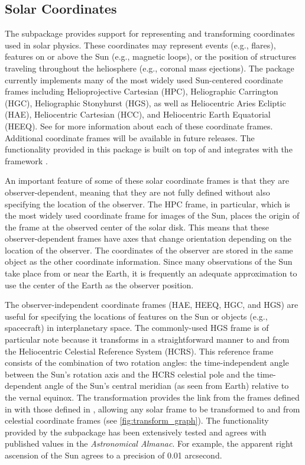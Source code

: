 \subsection{Solar Coordinates}
\label{sec:coords}

The  subpackage provides support for representing and transforming coordinates used in solar physics.
These coordinates may represent events (e.g., flares), features on or above the Sun (e.g., magnetic loops), or the position of structures traveling throughout the heliosphere (e.g., coronal mass ejections).
The package currently implements many of the most widely used Sun-centered coordinate frames including Helioprojective Cartesian (HPC), Heliographic Carrington (HGC), Heliographic Stonyhurst (HGS),  as well as Heliocentric Aries Ecliptic (HAE), Heliocentric Cartesian (HCC), and Heliocentric Earth Equatorial (HEEQ).
See \citet{2006A&A...449..791T} for more information about each of these coordinate frames.
Additional coordinate frames will be available in future releases.
The functionality provided in this package is built on top of and integrates with the  framework \citep[see Section 3.3 of][]{astropy2018}.

An important feature of some of these solar coordinate frames is that they are observer-dependent, meaning that they are not fully defined without also specifying the location of the observer.
The HPC frame, in particular, which is the most widely used coordinate frame for images of the Sun, places the origin of the frame at the observed center of the solar disk.
This means that these observer-dependent frames have axes that change orientation depending on the location of the observer.
The coordinates of the observer are stored in the same object as the other coordinate information.
Since many observations of the Sun take place from or near the Earth, it is frequently an adequate approximation to use the center of the Earth as the observer position.

The observer-independent coordinate frames (HAE, HEEQ, HGC, and HGS) are useful for specifying the locations of features on the Sun or objects (e.g., spacecraft) in interplanetary space.
The commonly-used HGS frame is of particular note because it transforms in a straightforward manner to and from the Heliocentric Celestial Reference System (HCRS).
This reference frame consists of the combination of two rotation angles: the time-independent angle between the Sun's rotation axis and the HCRS celestial pole \citep[see][]{2007CeMDA..98..155S} and the time-dependent angle of the Sun's central meridian (as seen from Earth) relative to the vernal equinox.
The transformation provides the link from the frames defined in  with those defined in , allowing any solar frame to be transformed to and from celestial coordinate frames (see \autoref{fig:transform_graph}).
The functionality provided by the  subpackage has been extensively tested and agrees with published values in the \textit{Astronomical Almanac}.
For example, the apparent right ascension of the Sun agrees to a precision of 0.01 arcsecond.

